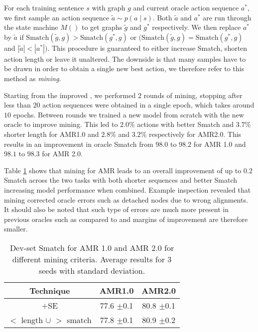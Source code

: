 \documentclass[11pt,a4paper]{article}
\begin{document}
For each training sentence $s$ with graph $g$ and current oracle action sequence $a^*$, we first sample an action sequence $\tilde{a} \sim p(a \mid s)$. Both $\tilde{a}$ and $a^*$ are run through the state machine $M()$ to get graphs $\tilde{g}$ and $g^*$ respectively. We then replace $a^*$ by $\tilde{a}$ if $\mathrm{Smatch}(\tilde{g},g) > \mathrm{Smatch}(g^*,g)$ or 
$(\mathrm{Smatch}(\tilde{g},g) = \mathrm{Smatch}(g^*,g)$ and $|\tilde{a}|<|a^*|)$. This procedure is guaranteed to either increase Smatch, shorten action length or leave it unaltered. The downside is that many samples have to be drawn in order to obtain a single new best action, we therefore refer to this method as \textit{mining}. 

Starting from the improved \cite{anon2020a}, we performed $2$ rounds of mining, stopping after less than $20$ action sequences were obtained in a single epoch, which takes around $10$ epochs\footnotemark{}. Between rounds we trained a new model from scratch with the new oracle to improve mining. This led to $2.0$\% actions with better Smatch and $3.7$\% shorter length for AMR1.0 and $2.8$\% and $3.2$\% respectively for AMR2.0. This results in an improvement in oracle Smatch from $98.0$ to $98.2$ for AMR 1.0 and $98.1$ to $98.3$ for AMR 2.0.

Table \ref{tab:miningovergold} shows that mining for AMR leads to an overall improvement of up to $0.2$ Smatch across the two tasks with both shorter sequences and better Smatch increasing model performance when combined. Example inspection revealed that mining corrected oracle errors such as detached nodes due to wrong alignments. It should also be noted that such type of errors are much more present in previous oracles such as \cite{naseem-etal-2019-rewarding} compared to \cite{anon2020a} and margins of improvement are therefore smaller.



\begin{table}[h]
    \centering
    \fontsize{10pt}{12pt}\selectfont
    \setlength{\tabcolsep}{2.0pt}
    \begin{tabular}{c | c | c }
        Technique & AMR1.0 & AMR2.0 \\
        \hline
        \cite{anon2020a}$+$SE & 77.6 \footnotesize{$\pm$0.1}   & 80.8 \footnotesize{$\pm$0.1}   \\
        \hline
$<$ length $\cup$ $>$ smatch  & 77.8 \footnotesize{$\pm$0.1} & 80.9 \footnotesize{$\pm$0.2}\\
        \hline
    \end{tabular}
    \caption{Dev-set Smatch for AMR 1.0 and AMR 2.0 for different mining criteria. Average results for $3$ seeds with standard deviation.}
    \label{tab:miningovergold}
\end{table}
 
\end{document}
